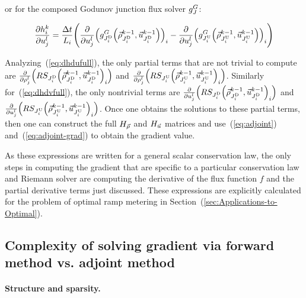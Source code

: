 or for the composed Godunov junction flux solver $g^{G}_{J}$:

\begin{equation}
\pfrac{\syseq_{\link}^{\tind}}{\condiscrete jl}=\frac{\Delta t}{L_{i}}\left(\pfrac{}{\condiscrete jl}\left(\god_{\jdown{\link}}\left(\juncstate{\jdown{\link}}{\tind-1},\junccon{\jdown{\link}}{\tind-1}\right)\right)_{\link}-\pfrac{}{\condiscrete jl}\left(\god_{\jup{\link}}\left(\juncstate{\jup{\link}}{\tind-1},\junccon{\jup{\link}}{\tind-1}\right)\right)_{\link}\right)\label{eqdhdvgod}
\end{equation}


Analyzing~(\ref{eq:dhdufull}), the only partial terms that are not
trivial to compute are $\pfrac{}{\discrete jl}\left(\RS_{\jdown{\link}}\left(\juncstate{\jdown{\link}}{\tind-1},\junccon{\jdown{\link}}{\tind-1}\right)_{\link}\right)$
and $\pfrac{}{\discrete jl}\left(\RS_{\jup{\link}}\left(\juncstate{\jup{\link}}{\tind-1},\junccon{\jup{\link}}{\tind-1}\right)_{\link}\right)$.
Similarly for~(\ref{eq:dhdvfull}), the only nontrivial terms are
$\pfrac{}{\condiscrete jl}\left(\RS_{\jdown{\link}}\left(\juncstate{\jdown{\link}}{\tind-1},\junccon{\jdown{\link}}{\tind-1}\right)_{\link}\right)$
and $\pfrac{}{\condiscrete jl}\left(\RS_{\jup{\link}}\left(\juncstate{\jup{\link}}{\tind-1},\junccon{\jup{\link}}{\tind-1}\right)_{\link}\right)$.
Once one obtains the solutions to these partial terms, then one can
construct the full $H_{\vec{\rho}}$ and $H_{\vec{u}}$ matrices and use~(\ref{eq:adjoint})
and~(\ref{eq:adjoint-grad}) to obtain the gradient value.

As these expressions are written for a general scalar conservation
law, the only steps in computing the gradient that are specific to
a particular conservation law and Riemann solver are computing the
derivative of the flux function $f$ and the partial derivative terms
just discussed. These expressions are explicitly calculated for the
problem of optimal ramp metering in Section~(\ref{sec:Applications-to-Optimal}).


\subsection{Complexity of solving gradient via forward method vs. adjoint method\label{sub:Complexity-of-solving}}


\paragraph{Structure and sparsity.\label{par:Structure-and-sparsity}}


